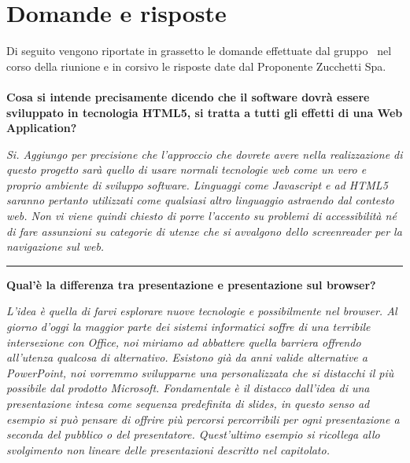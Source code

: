 \newenvironment{margini}[2]
{
	\begin{list}{} {
			\setlength{\leftmargin}{#1}
			\setlength{\rightmargin}{#2}
		} \item }
	{\end{list}}

\section{Domande e risposte}
Di seguito vengono riportate in grassetto le domande effettuate dal gruppo \gruppo\ nel corso della riunione e in corsivo le risposte date dal Proponente Zucchetti Spa.\\
\\\textbf{Cosa si intende precisamente dicendo che il software dovrà essere sviluppato in tecnologia HTML5, si tratta a tutti gli effetti di una Web Application?}\\
\begin{margini}{0.7cm}{0.7cm}
\textit{Si.  Aggiungo per  precisione che l'approccio che dovrete avere nella realizzazione di questo progetto sarà quello di usare normali tecnologie web come un vero e proprio ambiente di sviluppo software. Linguaggi come Javascript e ad HTML5 saranno pertanto utilizzati come qualsiasi altro linguaggio astraendo dal contesto web. Non vi viene quindi chiesto di porre l'accento su problemi di accessibilità né di fare assunzioni su categorie di utenze che si avvalgono dello screenreader per la navigazione sul web.}\\
\end{margini}
\hrule
\bigskip
\textbf{Qual'è la differenza tra presentazione e presentazione sul browser?}\\
\begin{margini}{0.7cm}{0.7cm}
	\textit{L'idea è quella di farvi esplorare nuove tecnologie e possibilmente nel browser. Al giorno d'oggi la maggior parte dei sistemi informatici soffre di una terribile intersezione con Office, noi miriamo ad abbattere quella barriera offrendo all'utenza qualcosa di alternativo. Esistono già da anni valide alternative a PowerPoint, noi vorremmo svilupparne una personalizzata che si distacchi il più possibile dal prodotto Microsoft. Fondamentale è il distacco dall'idea di una presentazione intesa come sequenza predefinita di slides, in questo senso ad esempio si può pensare di offrire più percorsi percorribili per ogni presentazione a seconda del pubblico o del presentatore. Quest'ultimo esempio si ricollega allo svolgimento non lineare delle presentazioni descritto nel capitolato.}\\
\end{margini}
